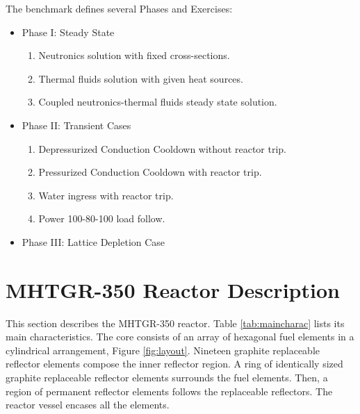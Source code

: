 The benchmark defines several Phases and Exercises:

\begin{itemize}
        \item Phase I: Steady State
        \begin{enumerate}
            \item Neutronics solution with fixed cross-sections. 
            \item Thermal fluids solution with given heat sources.
            \item Coupled neutronics-thermal fluids steady state solution.
        \end{enumerate}

        \item Phase II: Transient Cases
        \begin{enumerate}
            \item Depressurized Conduction Cooldown without reactor trip.
            \item Pressurized Conduction Cooldown with reactor trip.
            \item Water ingress with reactor trip.
            \item Power 100-80-100 load follow.
        \end{enumerate}

        \item Phase III: Lattice Depletion Case
\end{itemize}

\section{MHTGR-350 Reactor Description}

This section describes the \gls{MHTGR}-350 reactor.
Table \ref{tab:maincharac} lists its main characteristics.
The core consists of an array of hexagonal fuel elements in a cylindrical arrangement, Figure \ref{fig:layout}.
Nineteen graphite replaceable reflector elements compose the inner reflector region.
A ring of identically sized graphite replaceable reflector elements surrounds the fuel elements.
Then, a region of permanent reflector elements follows the replaceable reflectors.
The reactor vessel encases all the elements.

